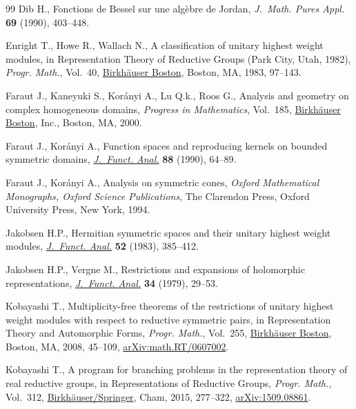 \documentclass[11pt]{article}
\numberwithin{equation}{section}
\begin{document}
\begin{thebibliography}{99}
Dib H., Fonctions de {B}essel sur une alg\`ebre de {J}ordan, \textit{J.~Math.
 Pures Appl.} \textbf{69} (1990), 403--448.

Enright T., Howe R., Wallach N., A classification of unitary highest weight
 modules, in Representation Theory of Reductive Groups ({P}ark {C}ity, {U}tah,
 1982), \textit{Progr. Math.}, Vol.~40, \href{https://doi.org/10.1007/978-1-4684-6730-7_7}{Birkh\"{a}user Boston}, Boston, MA,
 1983, 97--143.

Faraut J., Kaneyuki S., Kor\'{a}nyi A., Lu Q.k., Roos G., Analysis and geometry
 on complex homogeneous domains, \textit{Progress in Mathematics}, Vol.~185,
 \href{https://doi.org/10.1007/978-1-4612-1366-6}{Birkh\"{a}user Boston}, Inc., Boston, MA, 2000.

Faraut J., Kor\'{a}nyi A., Function spaces and reproducing kernels on bounded
 symmetric domains, \href{https://doi.org/10.1016/0022-1236(90)90119-6}{\textit{J.~Funct. Anal.}} \textbf{88} (1990), 64--89.

Faraut J., Kor\'{a}nyi A., Analysis on symmetric cones, \textit{Oxford Mathematical
 Monographs, Oxford Science Publications}, The Clarendon Press, Oxford
 University Press, New York, 1994.

Jakobsen H.P., Hermitian symmetric spaces and their unitary highest weight
 modules, \href{https://doi.org/10.1016/0022-1236(83)90076-9}{\textit{J.~Funct. Anal.}} \textbf{52} (1983), 385--412.

Jakobsen H.P., Vergne M., Restrictions and expansions of holomorphic
 representations, \href{https://doi.org/10.1016/0022-1236(79)90023-5}{\textit{J.~Funct. Anal.}} \textbf{34} (1979), 29--53.

Kobayashi T., Multiplicity-free theorems of the restrictions of unitary highest
 weight modules with respect to reductive symmetric pairs, in Representation
 Theory and Automorphic Forms, \textit{Progr. Math.}, Vol.~255, \href{https://doi.org/10.1007/978-0-8176-4646-2_3}{Birkh\"{a}user
 Boston}, Boston, MA, 2008, 45--109, \href{https://arxiv.org/abs/math.RT/0607002}{arXiv:math.RT/0607002}.

Kobayashi T., A program for branching problems in the representation theory of
 real reductive groups, in Representations of Reductive Groups, \textit{Progr.
 Math.}, Vol.~312, \href{https://doi.org/10.1007/978-3-319-23443-4_10}{Birkh\"{a}user/Springer}, Cham, 2015, 277--322,
 \href{https://arxiv.org/abs/1509.08861}{arXiv:1509.08861}.


\end{thebibliography}
\end{document}
